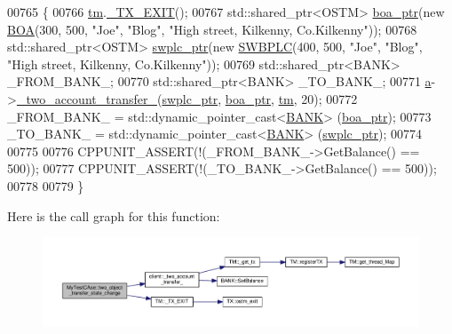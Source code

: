 \begin{DoxyCode}
00765                                                  \{
00766     \hyperlink{class_my_test_c_ase_a422e6e5d4ddedea384be96031c89b72b_a422e6e5d4ddedea384be96031c89b72b}{tm}.\hyperlink{class_t_m_a5e2d1127f2429f2f524d25f430eade06_a5e2d1127f2429f2f524d25f430eade06}{\_TX\_EXIT}();
00767     std::shared\_ptr<OSTM> \hyperlink{class_my_test_c_ase_ae0b2db5d35e25b3139beeda0705494f0_ae0b2db5d35e25b3139beeda0705494f0}{boa\_ptr}(\textcolor{keyword}{new} \hyperlink{class_b_o_a}{BOA}(300, 500, \textcolor{stringliteral}{"Joe"}, \textcolor{stringliteral}{"Blog"}, \textcolor{stringliteral}{"High street, Kilkenny,
       Co.Kilkenny"}));
00768     std::shared\_ptr<OSTM> \hyperlink{class_my_test_c_ase_aa8ccae9a5a7feb5bc47591c55a82d0cd_aa8ccae9a5a7feb5bc47591c55a82d0cd}{swplc\_ptr}(\textcolor{keyword}{new} \hyperlink{class_s_w_b_p_l_c}{SWBPLC}(400, 500, \textcolor{stringliteral}{"Joe"}, \textcolor{stringliteral}{"Blog"}, \textcolor{stringliteral}{"High street,
       Kilkenny, Co.Kilkenny"}));
00769     std::shared\_ptr<BANK> \_FROM\_BANK\_;
00770     std::shared\_ptr<BANK> \_TO\_BANK\_;
00771     \hyperlink{class_my_test_c_ase_a08f3a55850ffce171406f81f2f6c9c74_a08f3a55850ffce171406f81f2f6c9c74}{a}->\hyperlink{classclient_a71edd1265ba9ae03f71b5dbf54548696_a71edd1265ba9ae03f71b5dbf54548696}{\_two\_account\_transfer\_}(\hyperlink{class_my_test_c_ase_aa8ccae9a5a7feb5bc47591c55a82d0cd_aa8ccae9a5a7feb5bc47591c55a82d0cd}{swplc\_ptr}, \hyperlink{class_my_test_c_ase_ae0b2db5d35e25b3139beeda0705494f0_ae0b2db5d35e25b3139beeda0705494f0}{boa\_ptr}, 
      \hyperlink{class_my_test_c_ase_a422e6e5d4ddedea384be96031c89b72b_a422e6e5d4ddedea384be96031c89b72b}{tm}, 20);
00772     \_FROM\_BANK\_ = std::dynamic\_pointer\_cast<\hyperlink{class_b_a_n_k}{BANK}> (\hyperlink{class_my_test_c_ase_ae0b2db5d35e25b3139beeda0705494f0_ae0b2db5d35e25b3139beeda0705494f0}{boa\_ptr});
00773     \_TO\_BANK\_ = std::dynamic\_pointer\_cast<\hyperlink{class_b_a_n_k}{BANK}> (\hyperlink{class_my_test_c_ase_aa8ccae9a5a7feb5bc47591c55a82d0cd_aa8ccae9a5a7feb5bc47591c55a82d0cd}{swplc\_ptr});
00774 
00775    
00776     CPPUNIT\_ASSERT(!(\_FROM\_BANK\_->GetBalance() == 500));
00777     CPPUNIT\_ASSERT(!(\_TO\_BANK\_->GetBalance() == 500));
00778     
00779 \}
\end{DoxyCode}


Here is the call graph for this function\+:
\nopagebreak
\begin{figure}[H]
\begin{center}
\leavevmode
\includegraphics[width=350pt]{class_my_test_c_ase_ab9c76eb2dfd565a353ae9a5f604b36d9_ab9c76eb2dfd565a353ae9a5f604b36d9_cgraph}
\end{center}
\end{figure}




